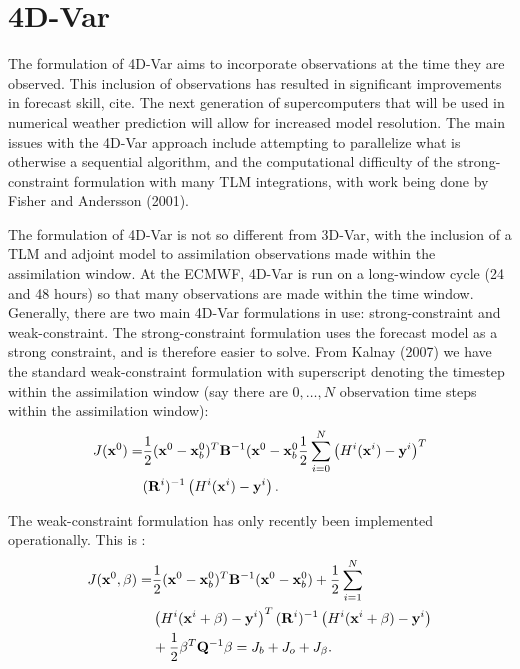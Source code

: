 \section{4D-Var}

The formulation of 4D-Var aims to incorporate observations at the time they are observed.
This inclusion of observations has resulted in significant improvements in forecast skill, cite.
The next generation of supercomputers that will be used in numerical weather prediction will allow for increased model resolution.
The main issues with the 4D-Var approach include attempting to parallelize what is otherwise a sequential algorithm, and the computational difficulty of the strong-constraint formulation with many TLM integrations, with work being done by Fisher and Andersson (2001). %

The formulation of 4D-Var is not so different from 3D-Var, with the inclusion of a TLM and adjoint model to assimilation observations made within the assimilation window.
At the ECMWF, 4D-Var is run on a long-window cycle (24 and 48 hours) so that many observations are made within the time window.
Generally, there are two main 4D-Var formulations in use: strong-constraint and weak-constraint.
The strong-constraint formulation uses the forecast model as a strong constraint, and is therefore easier to solve.
From Kalnay (2007) we have the standard weak-constraint formulation with superscript denoting the timestep within the assimilation window (say there are $0,\ldots,N$ observation time steps within the assimilation window):
\begin{align*} J(\mathbf{x}^0) = &\frac{1}{2} (\mathbf{x}^0 - \mathbf{x}^0_b) ^T \mathbf{B} ^{-1} (\mathbf{x}^0 - \mathbf{x}_b^0 \frac{1}{2} \sum _{i=0}^N \left( H^i(\mathbf{x}^i)-\mathbf{y}^i\right)^T\\
&(\mathbf{R}^i) ^{-1} \left( H^i(\mathbf{x}^i)-\mathbf{y}^i \right ) .\end{align*}

The weak-constraint formulation has only recently been implemented operationally.
This is :
\begin{align*} J(\mathbf{x}^0 , \beta) = &\frac{1}{2} (\mathbf{x}^0 - \mathbf{x}^0_b)^T \mathbf{B}^{-1} (\mathbf{x}^0 - \mathbf{x}^0_b) + \frac{1}{2} \sum _{i=1} ^N\\
& \left(H^i(\mathbf{x}^i+\beta)-\mathbf{y}^i\right)^T (\mathbf{R}^i)^{-1} \left(H^i(\mathbf{x}^i+\beta)-\mathbf{y}^i\right) \\
&+\frac{1}{2}\beta^T\mathbf{Q}^{-1}\beta = J_b +J_o+J_\beta.\end{align*}

